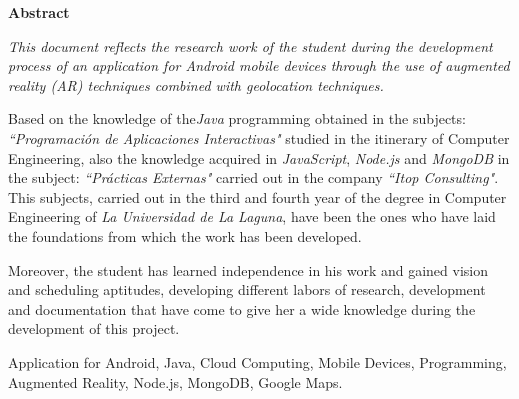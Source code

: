 \documentclass[spanish,a4paper,12pt,oneside]{extreport}
\newenvironment{summary}
{\par\noindent\begin{center}\textbf{Abstract}\end{center}\begin{itshape}\par\noindent}
{\end{itshape}}
\newenvironment{keywords}
{\begin{list}{}{\setlength{\leftmargin}{1em}}\item[\hskip\labelsep \bfseries Keywords:]}
{\end{list}}
\begin{document}
\newpage  %
\begin{summary}

{\em
This document reflects the research work of the student during the development process of an application for Android mobile devices through the use of augmented reality (AR) techniques combined with geolocation techniques.

\bigskip

Based on the knowledge of the\textit{Java} programming obtained in the
subjects: \textit{“Programación de Aplicaciones Interactivas"} studied in the itinerary
of Computer Engineering, also the knowledge acquired in \textit{JavaScript}, \textit{Node.js} and \textit{MongoDB} in the subject: \textit{“Prácticas Externas"} carried out in the company \textit{“Itop Consulting"}. This subjects, carried out in the third and fourth year of the degree in Computer Engineering of \textit{La Universidad de La Laguna}, have been the ones who have laid the foundations from which the work has been developed.

\bigskip
Moreover, the student has learned independence in his work and gained vision and scheduling aptitudes, developing different labors of research, development and documentation that have come to give her a wide knowledge during the development of this project.

}

\begin{keywords}
Application for Android, Java, Cloud Computing, Mobile Devices, Programming, Augmented Reality, Node.js, MongoDB, Google Maps.
\end{keywords}

\end{summary}

\newpage{\pagestyle{empty}}
\thispagestyle{empty}



\pagestyle{myheadings} %

\renewcommand{\thepage}{\roman{page}}
\setcounter{page}{1}
\end{document}
